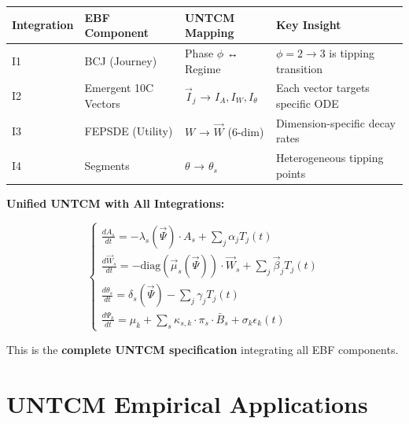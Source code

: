 \begin{tcolorbox}[colback=yellow!5!white, colframe=yellow!75!black,
    title=\textbf{UNTCM Framework Integration: Summary}]

\begin{center}
\renewcommand{\arraystretch}{1.3}
\begin{tabular}{@{}llll@{}}
\toprule
\textbf{Integration} & \textbf{EBF Component} & \textbf{UNTCM Mapping} & \textbf{Key Insight} \\
\midrule
I1 & BCJ (Journey) & Phase $\phi$ ↔ Regime & $\phi=2→3$ is tipping transition \\
I2 & Emergent 10C Vectors & $\vec{I}_j$ → $I_A, I_W, I_\theta$ & Each vector targets specific ODE \\
I3 & FEPSDE (Utility) & $W$ → $\vec{W}$ (6-dim) & Dimension-specific decay rates \\
I4 & Segments & $\theta$ → $\theta_s$ & Heterogeneous tipping points \\
\bottomrule
\end{tabular}
\end{center}

\textbf{Unified UNTCM with All Integrations:}

\begin{equation}
\boxed{
\begin{cases}
\displaystyle\frac{dA_s}{dt} = -\lambda_s(\vec{\Psi}) \cdot A_s + \sum_j \alpha_j T_j(t) \\[0.8em]
\displaystyle\frac{d\vec{W}_s}{dt} = -\text{diag}(\vec{\mu}_s(\vec{\Psi})) \cdot \vec{W}_s + \sum_j \vec{\beta}_j T_j(t) \\[0.8em]
\displaystyle\frac{d\theta_s}{dt} = \delta_s(\vec{\Psi}) - \sum_j \gamma_j T_j(t) \\[0.8em]
\displaystyle\frac{d\Psi_k}{dt} = \mu_k + \sum_s \kappa_{s,k} \cdot \pi_s \cdot \bar{B}_s + \sigma_k \epsilon_k(t)
\end{cases}
}
\label{eq:untcm-full}
\end{equation}

This is the \textbf{complete UNTCM specification} integrating all EBF components.

\end{tcolorbox}


\section{UNTCM Empirical Applications}
\label{sec:untcm-empirical}

